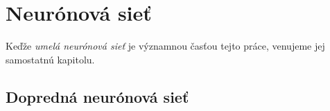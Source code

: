 \chapter{Neurónová sieť}\label{chap:neuralnet}
Keďže \textit{umelá neurónová sieť} je významnou časťou tejto práce, venujeme jej samostatnú kapitolu.

\section{Dopredná neurónová sieť}